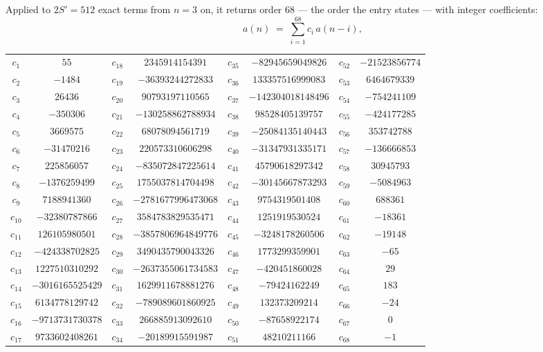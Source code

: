 \documentclass[11pt,a4paper]{article}
\theoremstyle{plain}
\theoremstyle{definition}
\begin{document}
Applied to $2S'=512$ exact terms from $n=3$ on, it returns order $68$ --- the
order the entry states --- with integer coefficients:
\[
a(n)\;=\;\sum_{i=1}^{68}c_i\,a(n-i),
\]
\begin{center}\small
\begin{tabular}{cccccccc}
$c_{1}$ & $55$ & $c_{18}$ & $2345914154391$ & $c_{35}$ & $-82945659049826$ & $c_{52}$ & $-21523856774$ \\
$c_{2}$ & $-1484$ & $c_{19}$ & $-36393244272833$ & $c_{36}$ & $133357516999083$ & $c_{53}$ & $6464679339$ \\
$c_{3}$ & $26436$ & $c_{20}$ & $90793197110565$ & $c_{37}$ & $-142304018148496$ & $c_{54}$ & $-754241109$ \\
$c_{4}$ & $-350306$ & $c_{21}$ & $-130258862788934$ & $c_{38}$ & $98528405139757$ & $c_{55}$ & $-424177285$ \\
$c_{5}$ & $3669575$ & $c_{22}$ & $68078094561719$ & $c_{39}$ & $-25084135140443$ & $c_{56}$ & $353742788$ \\
$c_{6}$ & $-31470216$ & $c_{23}$ & $220573310606298$ & $c_{40}$ & $-31347931335171$ & $c_{57}$ & $-136666853$ \\
$c_{7}$ & $225856057$ & $c_{24}$ & $-835072847225614$ & $c_{41}$ & $45790618297342$ & $c_{58}$ & $30945793$ \\
$c_{8}$ & $-1376259499$ & $c_{25}$ & $1755037814704498$ & $c_{42}$ & $-30145667873293$ & $c_{59}$ & $-5084963$ \\
$c_{9}$ & $7188941360$ & $c_{26}$ & $-2781677996473068$ & $c_{43}$ & $9754319501408$ & $c_{60}$ & $688361$ \\
$c_{10}$ & $-32380787866$ & $c_{27}$ & $3584783829535471$ & $c_{44}$ & $1251919530524$ & $c_{61}$ & $-18361$ \\
$c_{11}$ & $126105980501$ & $c_{28}$ & $-3857806964849776$ & $c_{45}$ & $-3248178260506$ & $c_{62}$ & $-19148$ \\
$c_{12}$ & $-424338702825$ & $c_{29}$ & $3490435790043326$ & $c_{46}$ & $1773299359901$ & $c_{63}$ & $-65$ \\
$c_{13}$ & $1227510310292$ & $c_{30}$ & $-2637355061734583$ & $c_{47}$ & $-420451860028$ & $c_{64}$ & $29$ \\
$c_{14}$ & $-3016165525429$ & $c_{31}$ & $1629911678881276$ & $c_{48}$ & $-79424162249$ & $c_{65}$ & $183$ \\
$c_{15}$ & $6134778129742$ & $c_{32}$ & $-789089601860925$ & $c_{49}$ & $132373209214$ & $c_{66}$ & $-24$ \\
$c_{16}$ & $-9713731730378$ & $c_{33}$ & $266885913092610$ & $c_{50}$ & $-87658922174$ & $c_{67}$ & $0$ \\
$c_{17}$ & $9733602408261$ & $c_{34}$ & $-20189915591987$ & $c_{51}$ & $48210211166$ & $c_{68}$ & $-1$ \\
\end{tabular}
\end{center}
\end{document}
